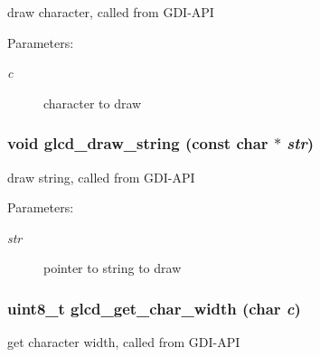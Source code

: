 draw character, called from GDI-API 

\begin{Desc}
\item[Parameters:]
\begin{description}
\item[{\em c}]character to draw \end{description}
\end{Desc}
\hypertarget{group__graphic__device__font_gcd9fe916d077689750b8db36268e97e5}{
\subsubsection[{glcd\_\-draw\_\-string}]{\setlength{\rightskip}{0pt plus 5cm}void glcd\_\-draw\_\-string (const char $\ast$ {\em str})}}
\label{group__graphic__device__font_gcd9fe916d077689750b8db36268e97e5}


draw string, called from GDI-API \begin{Desc}
\item[Parameters:]
\begin{description}
\item[{\em str}]pointer to string to draw \end{description}
\end{Desc}
\hypertarget{group__graphic__device__font_gac9f46ba71240ab10226e2301453baca}{
\subsubsection[{glcd\_\-get\_\-char\_\-width}]{\setlength{\rightskip}{0pt plus 5cm}uint8\_\-t glcd\_\-get\_\-char\_\-width (char {\em c})}}
\label{group__graphic__device__font_gac9f46ba71240ab10226e2301453baca}


get character width, called from GDI-API 

